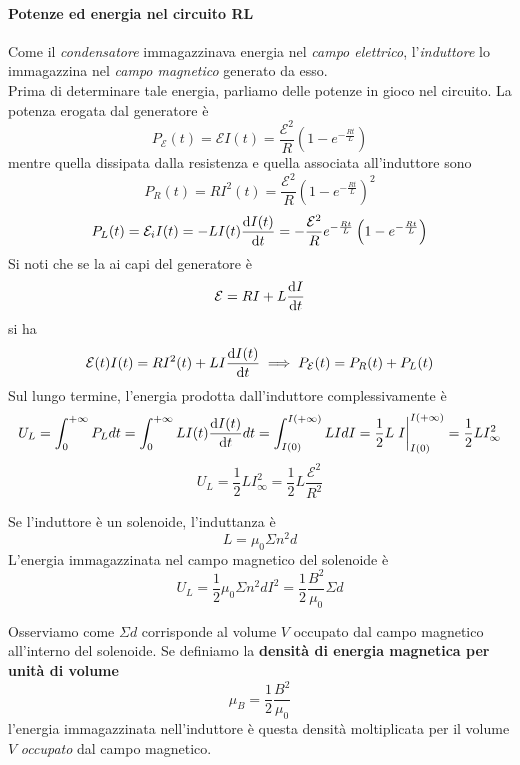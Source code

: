 \paragraph{Potenze ed energia nel circuito RL}
Come il \textit{condensatore} immagazzinava energia nel \textit{campo elettrico}, l'\textit{induttore} lo immagazzina nel \textit{campo magnetico} generato da esso.\\
Prima di determinare tale energia, parliamo delle potenze in gioco nel circuito. La potenza erogata dal generatore è
\begin{equation}
	P_{\mathcal{E}}(t)=\mathcal{E}I(t)=\frac{\mathcal{E}^2}{R}\left(1-e^{-\frac{Rt}{L}}\right)
\end{equation}
mentre quella dissipata dalla resistenza e quella associata all'induttore sono
\begin{equation}
	P_{R}(t)=RI^2(t)=\frac{\mathcal{E}^2}{R}\left(1-e^{-\frac{Rt}{L}}\right)^2
\end{equation}
\begin{equation}
	P_{L}(t)=\mathcal{E}_iI(t)=-LI(t)\dv{I(t)}{t}=-\frac{\mathcal{E}^2}{R}e^{-\frac{Rt}{L}}\left(1-e^{-\frac{Rt}{L}}\right)
\end{equation}
Si noti che se la \ddp ai capi del generatore è
\begin{equation}
	\mathcal{E}=RI+L\dv{I}{t}
\end{equation}
si ha
\begin{equation*}
	\mathcal{E}(t)I(t)=RI^2(t)+LI\dv{I(t)}{t}\implies P_{\mathcal{E}}(t)=P_R(t)+P_L(t)
\end{equation*}
Sul lungo termine, l'energia prodotta dall'induttore complessivamente è
\begin{equation*}
	U_L=\int_0^{+\infty}P_Ldt=\int_0^{+\infty} LI(t)\dv{I(t)}{t}dt=\int_{I(0)}^{I(+\infty)}
	LIdI=\frac{1}{2}L\eval{I}_{I(0)}^{I(+\infty)}=\frac{1}{2}LI_{\infty}^2
\end{equation*}
\begin{equation}
	U_L=\frac{1}{2}L I_{\infty}^2=\frac{1}{2}L\frac{\mathcal{E}^2}{R^2}
\end{equation}
\begin{examplewt}[Solenoide]
	Se l'induttore è un solenoide, l'induttanza è
	\begin{equation*}
		L=\mu_0 \Sigma n^2 d
	\end{equation*}
	L'energia immagazzinata nel campo magnetico del solenoide è
	\begin{equation}
		U_L=\frac{1}{2}\mu_0\Sigma n^2 d  I^2=\frac{1}{2}\frac{B^2}{\mu_0}\Sigma d
	\end{equation}
\end{examplewt}
Osserviamo come $\Sigma d$ corrisponde al volume $V$ occupato dal campo magnetico all'interno del solenoide. Se definiamo la \textbf{densità di energia magnetica per unità di volume}
\begin{equation}\label{DensitàEnergiaMagnetica}
	\mu_{B}=\frac{1}{2}\frac{B^2}{\mu_0}
\end{equation}
l'energia immagazzinata nell'induttore è questa densità moltiplicata per il volume $V$ \textit{occupato} dal campo magnetico.
